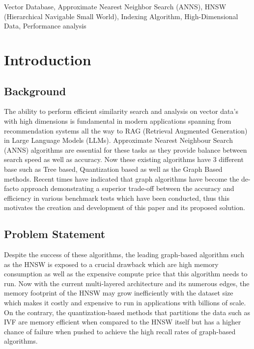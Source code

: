 \documentclass[conference]{IEEEtran}
\begin{document}
\begin{IEEEkeywords}
Vector Database, Approximate Nearest Neighbor Search (ANNS), HNSW (Hierarchical Navigable Small World), Indexing Algorithm, High-Dimensional Data, Performance analysis
\end{IEEEkeywords}

\section{Introduction}

\subsection{Background}
The ability to perform efficient similarity search and analysis on vector data's with high dimensions is fundamental in modern applications spanning from recommendation systems all the way to RAG (Retrieval Augmented Generation) in Large Language Models (LLMs). Approximate Nearest Neighbour Search (ANNS) algorithms are essential for these tasks as they provide balance between search speed as well as accuracy. Now these existing algorithms have 3 different base such as Tree based, Quantization based as well as the Graph Based methods. Recent times have indicated that graph algorithms have become the de-facto approach demonstrating a superior trade-off between the accuracy and efficiency in various benchmark tests which have been conducted, thus this motivates the creation and development of this paper and its proposed solution.

\subsection{Problem Statement}
Despite the success of these algorithms, the leading graph-based algorithm such as the HNSW is exposed to a crucial drawback which are high memory consumption as well as the expensive compute price that this algorithm needs to run. Now with the current multi-layered architecture and its numerous edges, the memory footprint of the HNSW may grow inefficiently with the dataset size which makes it costly and expensive to run in applications with billions of scale. On the contrary, the quantization-based methods that partitions the data such as IVF are memory efficient when compared to the HNSW itself but has a higher chance of failure when pushed to achieve the high recall rates of graph-based algorithms.
\end{document}
